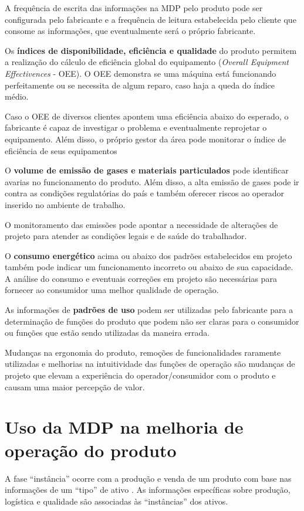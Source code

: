 	A frequência de escrita das informações na MDP pelo produto pode ser configurada pelo fabricante e a frequência de leitura estabelecida pelo cliente que consome as informações, que eventualmente será o próprio fabricante.
	
	Os \textbf{índices de disponibilidade, eficiência e qualidade} do produto permitem a realização do cálculo de eficiência global do equipamento (\textit{Overall Equipment Effectivences} - OEE). O OEE demonstra se uma máquina está funcionando perfeitamente ou se necessita de algum reparo, caso haja a queda do índice médio.
	
	Caso o OEE de diversos clientes apontem uma eficiência abaixo do esperado, o fabricante é capaz de investigar o problema e eventualmente reprojetar o equipamento. Além disso, o próprio gestor da área pode monitorar o índice de eficiência de seus equipamentos
	
	O \textbf{volume de emissão de gases e materiais particulados} pode identificar avarias no funcionamento do produto. Além disso, a alta emissão de gases pode ir contra as condições regulatórias do país e também oferecer riscos ao operador inserido no ambiente de trabalho.
	
	O monitoramento das emissões pode apontar a necessidade de alterações de projeto para atender as condições legais e de saúde do trabalhador.
	
	O \textbf{consumo energético} acima ou abaixo dos padrões estabelecidos em projeto também pode indicar um funcionamento incorreto ou abaixo de sua capacidade. A análise do consumo e eventuais correções em projeto são necessárias para fornecer ao consumidor uma melhor qualidade de operação.
	
	As informações de \textbf{padrões de uso} podem ser utilizadas pelo fabricante para a determinação de funções do produto que podem não ser claras para o consumidor ou funções que estão sendo utilizadas da maneira errada.
	
	Mudanças na ergonomia do produto, remoções de funcionalidades raramente utilizadas e melhorias na intuitividade das funções de operação são mudanças de projeto que elevam a experiência do operador/consumidor com o produto e causam uma maior percepção de valor.


\section{Uso da MDP na melhoria de operação do produto}

	A fase ``instância'' ocorre com a produção e venda de um produto com base nas informações de um ``tipo'' de ativo \cite{bader2019aas}. As informações específicas sobre produção, logística e qualidade são associadas às ``instâncias'' dos ativos.
	
